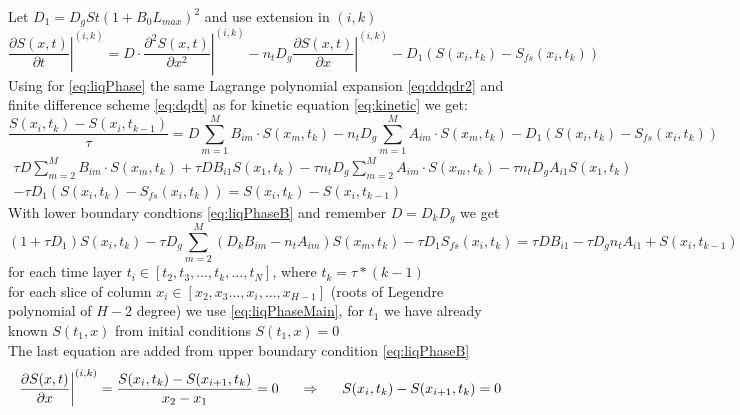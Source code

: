 \documentclass[12pt]{article}
\begin{document}
Let $D_1=D_gSt(1+B_0L_{max})^2$ and use extension in $(i, k)$
\begin{equation}\label{eq:liqPhase}
\left.\dfrac{\partial S(x,t)}{\partial t}\right|^{(i, k)}=
D \cdot \left.\dfrac{\partial^2 S(x,t)}{\partial x^2}\right|^{(i, k)}-\left.n_tD_g\dfrac{\partial S(x,t)}{\partial x}\right|^{(i, k)}-D_1(S(x_i,t_k)-S_{fs}(x_i,t_k))
\end{equation}
Using for \eqref{eq:liqPhase} the same Lagrange polynomial expansion \eqref{eq:ddqdr2} and finite difference scheme \eqref{eq:dqdt} as for kinetic equation  \eqref{eq:kinetic} we get:
\begin{equation}\label{eq:liqPhase1}
\dfrac{S(x_i,t_k) - S(x_i,t_{k-1})}{\tau}=
D\sum_{m=1}^MB_{im}\cdot S(x_m, t_k) -n_tD_g\sum_{m=1}^MA_{im}\cdot S(x_m, t_k) - D_1(S(x_i,t_k)-S_{fs}(x_i,t_k))
\end{equation}
\begin{multline}
\tau D\sum_{m=2}^MB_{im}\cdot S(x_m, t_k) + \tau D B_{i1}S(x_1, t_k) -\tau n_tD_g\sum_{m=2}^MA_{im}\cdot S(x_m, t_k) -  \tau n_tD_g A_{i1}S(x_1, t_k)\\
-\tau D_1(S(x_i,t_k)-S_{fs}(x_i,t_k))
 = S(x_i,t_k) - S(x_i,t_{k-1})
\end{multline}
With lower boundary condtions \eqref{eq:liqPhaseB} and remember $D=D_kD_g$ we get
\begin{equation}\label{eq:liqPhaseMain}
(1  + \tau D_1)S(x_i,t_k) - \tau D_g\sum_{m=2}^M(D_kB_{im}-n_tA_{im})S(x_m,t_k) - \tau D_1S_{fs}(x_i,t_k)  =
\tau D B_{i1} - \tau D_g n_t A_{i1} + S(x_i,t_{k-1}) 
\end{equation}
for each time layer $t_i \in [t_2, t_3, ..., t_k, ..., t_N]$, where $t_k=\tau*(k-1)$ \\
for each slice of column $x_i \in [x_2, x_3 ..., x_i, ..., x_{H-1}]$ (roots of Legendre polynomial of $H-2$ degree) we use \eqref{eq:liqPhaseMain}, for $t_1$ we have already known $S(t_1, x)$ from initial conditions $S(t_1, x) = 0$\\
The last equation are added from upper boundary condition \eqref{eq:liqPhaseB}
\begin{equation}
\left.\dfrac{\partial S(x,t)}{\partial x}\right\vert^{(i, k)}=
\dfrac{S(x_i, t_k) - S(x_{i+1}, t_k)}{x_2-x_1}=0 \indent\Rightarrow\indent S(x_i, t_k) - S(x_{i+1}, t_k)=0
\end{equation}\\
\end{document}
